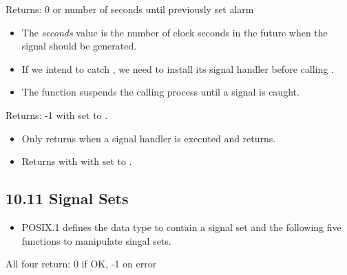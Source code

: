 \documentclass[]{article}
\begin{document}


Returns: 0 or number of seconds until previously set alarm

\begin{itemize}
\item The \emph{seconds} value is the number of clock seconds in the future when
the signal should be generated.
\item If we intend to catch , we need to install its signal
handler before calling .
\item The  function suspends the calling process until a signal is
caught.
\end{itemize}



Returns: -1 with  set to .

\begin{itemize}
\item Only returns when a signal handler is executed and returns.
\item Returns with  with  set to .
\end{itemize}

\subsection*{10.11 Signal Sets}
\begin{itemize}
\item POSIX.1 defines the data type  to contain a signal set and
the following five functions to manipulate singal sets.
\end{itemize}






All four return: 0 if OK, -1 on error \\

\end{document}

